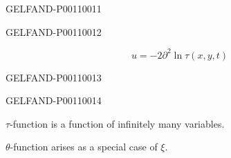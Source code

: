 \begin{GelfandAdjacentEvidence}{GELFAND-P001100}{11}

\end{GelfandAdjacentEvidence}
\begin{GelfandAdjacentEvidence}{GELFAND-P001100}{12}


\[
u=-2\partial^2\ln\tau(x,y,t)
\]
\end{GelfandAdjacentEvidence}
\begin{GelfandAdjacentEvidence}{GELFAND-P001100}{13}

\end{GelfandAdjacentEvidence}
\begin{GelfandAdjacentEvidence}{GELFAND-P001100}{14}


$\tau$-function is a function of infinitely many variables.

$\theta$-function arises as a special case of $\xi$.
\end{GelfandAdjacentEvidence}



